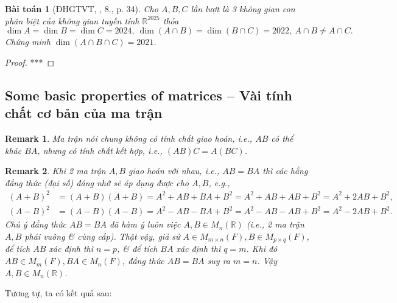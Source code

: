 \documentclass{article}
\newtheorem{baitoan}{Bài toán}
\newtheorem{remark}{Remark}
\begin{document}
\begin{baitoan}[ĐHGTVT, \cite{VMS_VMC2025}, 8., p. 34]
	Cho $A,B,C$ lần lượt là 3 không gian con phân biệt của không gian tuyến tính $\mathbb{R}^{2025}$ thỏa
	\begin{equation*}
		\dim A = \dim B = \dim C = 2024,\ \dim(A\cap B) = \dim(B\cap C) = 2022,\ A\cap B\ne A\cap C.
	\end{equation*}
	Chứng minh $\dim(A\cap B\cap C) = 2021$.
\end{baitoan}

\begin{proof}
	***
\end{proof}


\subsection{Some basic properties of matrices -- Vài tính chất cơ bản của ma trận}

\begin{remark}
	Ma trận nói chung không có tính chất giao hoán, i.e., $AB$ có thể khác $BA$, nhưng có tính chất kết hợp, i.e., $(AB)C = A(BC)$.
\end{remark}

\begin{remark}
	Khi 2 ma trận $A,B$ giao hoán với nhau, i.e., $AB = BA$ thì các hằng đẳng thức (đại số) đáng nhớ sẽ áp dụng được cho $A,B$, e.g.,
	\begin{align*}
		(A + B)^2 &= (A + B)(A + B) = A^2 + AB + BA + B^2 = A^2 + AB + AB + B^2 = A^2 + 2AB + B^2,\\
		(A - B)^2 &= (A - B)(A - B) = A^2 - AB - BA + B^2 = A^2 - AB - AB + B^2 = A^2 - 2AB + B^2. 
	\end{align*}
	Chú ý đẳng thức $AB = BA$ đã hàm ý luôn việc $A,B\in M_n(\mathbb{R})$ (i.e., 2 ma trận $A,B$ phải vuông \& cùng cấp). Thật vậy, giả sử $A\in  M_{m\times n}(F),B\in M_{p\times q}(F)$, để tích $AB$ xác định thì $n = p$, \& để tích $BA$ xác định thì $q = m$. Khi đó $AB\in M_m(F),BA\in M_n(F)$, đẳng thức $AB = BA$ suy ra $m = n$. Vậy $A,B\in M_n(\mathbb{R})$.
\end{remark}
Tương tự, ta có kết quả sau:
\end{document}
